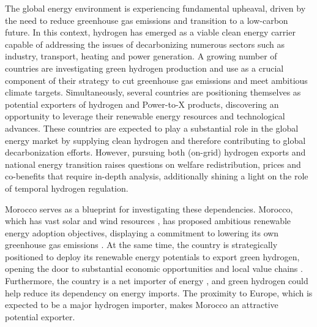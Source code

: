The global energy environment is experiencing fundamental upheaval, driven by the need to reduce greenhouse gas emissions and transition to a low-carbon future. In this context, hydrogen has emerged as a viable clean energy carrier capable of addressing the issues of decarbonizing numerous sectors such as industry, transport, heating and power generation. A growing number of countries are investigating green hydrogen production and use as a crucial component of their strategy to cut greenhouse gas emissions and meet ambitious climate targets.
Simultaneously, several countries are positioning themselves as potential exporters of hydrogen and Power-to-X products, discovering an opportunity to leverage their renewable energy resources and technological advances. %
These countries are expected to play a substantial role in the global energy market by supplying clean hydrogen and therefore contributing to global decarbonization efforts. However, pursuing both (on-grid) hydrogen exports and national energy transition raises questions on welfare redistribution, prices and co-benefits that require in-depth analysis, additionally shining a light on the role of temporal hydrogen regulation.

Morocco serves as a blueprint for investigating these dependencies. Morocco, which has vast solar and wind resources \cite{Peters2023, Touili2018, Sterl2022}, has proposed ambitious renewable energy adoption objectives, displaying a commitment to lowering its own greenhouse gas emissions \cite{CAT2021}. At the same time, the country is strategically positioned to deploy its renewable energy potentials to export green hydrogen, opening the door to substantial economic opportunities and local value chains \cite{Ersoy2022}. Furthermore, the country is a net importer of energy \cite{IEA2022}, and green hydrogen could help reduce its dependency on energy imports. The proximity to Europe, which is expected to be a major hydrogen importer, makes Morocco an attractive potential exporter. 


